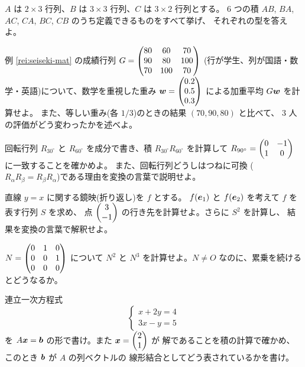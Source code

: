 \begin{mondai}[基本]\label{q:matmul-ex3}
$A$ は $2 \times 3$ 行列、$B$ は $3 \times 3$ 行列、$C$ は $3 \times 2$ 行列とする。
$6$ つの積 $AB$, $BA$, $AC$, $CA$, $BC$, $CB$ のうち定義できるものをすべて挙げ、
それぞれの型を答えよ。
\end{mondai}

\begin{mondai}[基本]\label{q:matmul-ex4}
例 \ref{rei:seiseki-mat} の成績行列
$G = \begin{pmatrix}80 & 60 & 70 \\ 90 & 80 & 100 \\ 70 & 100 & 70\end{pmatrix}$
(行が学生、列が国語・数学・英語)について、数学を重視した重み
$\bm{w} = \begin{pmatrix}0.2 \\ 0.5 \\ 0.3\end{pmatrix}$ による加重平均 $G\bm{w}$ を計算せよ。
また、等しい重み(各 $1/3$)のときの結果 $(70, 90, 80)$ と比べて、
$3$ 人の評価がどう変わったかを述べよ。
\end{mondai}

\begin{mondai}[標準]\label{q:matmul-ex5}
回転行列 $R_{30^\circ}$ と $R_{60^\circ}$ を成分で書き、積
$R_{30^\circ} R_{60^\circ}$ を計算して
$R_{90^\circ} = \begin{pmatrix}0 & -1 \\ 1 & 0\end{pmatrix}$ に一致することを確かめよ。
また、回転行列どうしはつねに可換
($R_\alpha R_\beta = R_\beta R_\alpha$)である理由を変換の言葉で説明せよ。
\end{mondai}

\begin{mondai}[標準]\label{q:matmul-ex6}
直線 $y = x$ に関する鏡映(折り返し)を $f$ とする。
$f(\bm{e}_1)$ と $f(\bm{e}_2)$ を考えて $f$ を表す行列 $S$ を求め、
点 $\begin{pmatrix}3 \\ -1\end{pmatrix}$ の行き先を計算せよ。さらに $S^2$ を計算し、
結果を変換の言葉で解釈せよ。
\end{mondai}

\begin{mondai}[標準]\label{q:matmul-ex7}
$N = \begin{pmatrix}0 & 1 & 0 \\ 0 & 0 & 1 \\ 0 & 0 & 0\end{pmatrix}$ について
$N^2$ と $N^3$ を計算せよ。$N \neq O$ なのに、累乗を続けるとどうなるか。
\end{mondai}

\begin{mondai}[標準]\label{q:matmul-ex8}
連立一次方程式
\[
\begin{cases}
x + 2y = 4 \\
3x - y = 5
\end{cases}
\]
を $A\bm{x} = \bm{b}$ の形で書け。また $\bm{x} = \begin{pmatrix}2 \\ 1\end{pmatrix}$ が
解であることを積の計算で確かめ、このとき $\bm{b}$ が $A$ の列ベクトルの
線形結合としてどう表されているかを書け。
\end{mondai}

